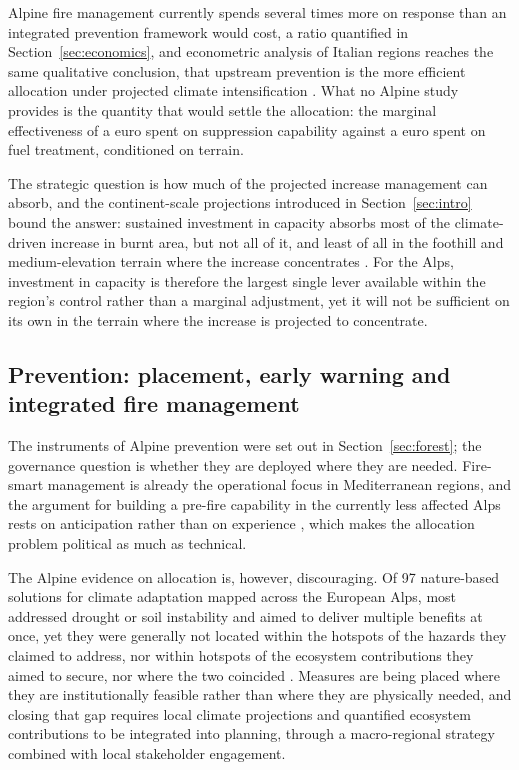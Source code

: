 \documentclass[11pt,a4paper]{article}
\begin{document}
Alpine fire management currently spends several times more on response than an integrated prevention framework would cost, a ratio quantified in Section~\ref{sec:economics}, and econometric analysis of Italian regions reaches the same qualitative conclusion, that upstream prevention is the more efficient allocation under projected climate intensification \citep{michetti_forest_2019}. What no Alpine study provides is the quantity that would settle the allocation: the marginal effectiveness of a euro spent on suppression capability against a euro spent on fuel treatment, conditioned on terrain.

The strategic question is how much of the projected increase management can absorb, and the continent-scale projections introduced in Section~\ref{sec:intro} bound the answer: sustained investment in capacity absorbs most of the climate-driven increase in burnt area, but not all of it, and least of all in the foothill and medium-elevation terrain where the increase concentrates \citep{billing_future_2026}. For the Alps, investment in capacity is therefore the largest single lever available within the region's control rather than a marginal adjustment, yet it will not be sufficient on its own in the terrain where the increase is projected to concentrate.

\subsection{Prevention: placement, early warning and integrated fire management}

The instruments of Alpine prevention were set out in Section~\ref{sec:forest}; the governance question is whether they are deployed where they are needed. Fire-smart management is already the operational focus in Mediterranean regions, and the argument for building a pre-fire capability in the currently less affected Alps rests on anticipation rather than on experience \citep{gerberding_mapping_2025}, which makes the allocation problem political as much as technical.

The Alpine evidence on allocation is, however, discouraging. Of 97 nature-based solutions for climate adaptation mapped across the European Alps, most addressed drought or soil instability and aimed to deliver multiple benefits at once, yet they were generally not located within the hotspots of the hazards they claimed to address, nor within hotspots of the ecosystem contributions they aimed to secure, nor where the two coincided \citep{dubo_nature-based_2023}. Measures are being placed where they are institutionally feasible rather than where they are physically needed, and closing that gap requires local climate projections and quantified ecosystem contributions to be integrated into planning, through a macro-regional strategy combined with local stakeholder engagement.
\end{document}

